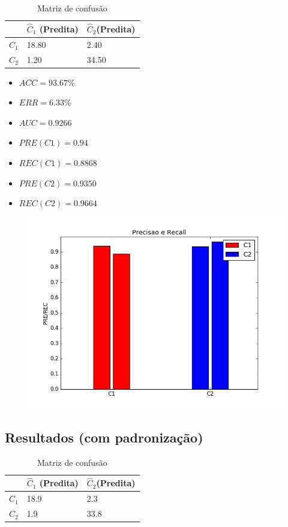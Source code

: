 \documentclass[11pt,a4paper]{article}
\numberwithin{equation}{section}
\begin{document}
\begin{table}[H]
\centering
\caption{Matriz de confusão}
\begin{tabular}{l l l}
\hline
 & \textbf{$\hat{C}_1$ (Predita)} & \textbf{$\hat{C}_2$(Predita)}\\
\hline
$C_1$ & 18.80&2.40\\ 
$C_2$ &  1.20&34.50\\ 
\hline
\end{tabular}
\end{table}

\begin{minipage}{.5\textwidth}
\begin{itemize}
\item $ACC = 93.67 \%$
\item $ERR =  6.33 \%$
\item $AUC = 0.9266 $
\item $PRE(C1) = 0.94$
\item $REC(C1) = 0.8868$
\item $PRE(C2) = 0.9350$
\item $REC(C2) = 0.9664$
\end{itemize}
\end{minipage}%
\begin{minipage}{.5\textwidth}
\begin{figure}[H]
\centering
  \includegraphics[width=\linewidth]{../img/naive_bayes_rec.png}
  \label{fig:percep}
\end{figure}
\end{minipage}%

\subsection{Resultados (com padronização)}
\begin{table}[H]
\centering
\caption{Matriz de confusão}
\begin{tabular}{l l l}
\hline
 & \textbf{$\hat{C}_1$ (Predita)} & \textbf{$\hat{C}_2$(Predita)}\\
\hline
$C_1$ &  18.9 & 2.3 \\
$C_2$ &  1.9 & 33.8 \\
\hline
\end{tabular}
\end{table}
\end{document}
